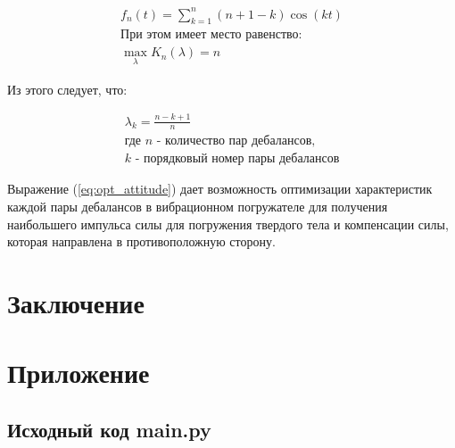 
\begin{equation}\label{eq:feer}
    \begin{gathered}
        f_n(t) = \sum \limits_{k=1}^n (n+1-k) \cos(kt) \\
        \textrm{При этом имеет место равенство:} \\
        \max \limits_{\lambda} K_n(\lambda) = n
    \end{gathered}
\end{equation}

Из этого следует, что:

\begin{equation}\label{eq:opt_attitude}
    \begin{gathered}
        \lambda_k = \frac{n - k + 1}{n} \\
        \textrm{где $n$ - количество пар дебалансов,} \\
        \textrm{$k$ - порядковый номер пары дебалансов}
    \end{gathered}
\end{equation}

Выражение (\ref{eq:opt_attitude}) дает возможность оптимизации характеристик каждой пары дебалансов в вибрационном погружателе для получения наибольшего импульса силы для погружения твердого тела и компенсации силы, которая направлена в противоположную сторону.


\clearpage
\section{Заключение}


\clearpage
\section{Приложение}
\subsection{Исходный код main.py}
% 


\clearpage
{}
\begin{thebibliography}{}
    \bibitem{}
\end{thebibliography}
